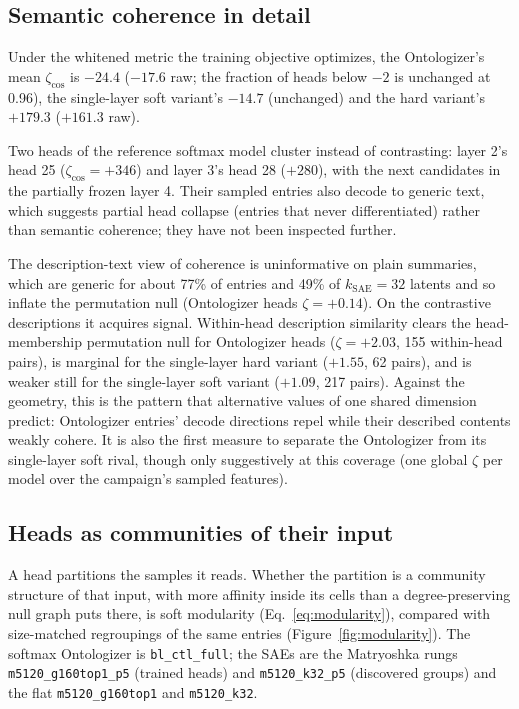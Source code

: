 \subsection{Semantic coherence in detail}
\label{sec:coherence}

Under the whitened metric the training objective optimizes, the
Ontologizer's mean $\zeta_{\cos}$ is $-24.4$ ($-17.6$ raw; the fraction of
heads below $-2$ is unchanged at 0.96), the single-layer soft variant's
$-14.7$ (unchanged) and the hard variant's $+179.3$ ($+161.3$ raw).

Two heads of the reference softmax model cluster instead of contrasting:
layer 2's head 25 ($\zeta_{\cos}{=}{+}346$) and layer 3's head 28
(${+}280$), with the next candidates in the partially frozen layer 4.
Their sampled entries also decode to generic text, which suggests partial
head collapse (entries that never differentiated) rather than semantic
coherence; they have not been inspected further.

The description-text view of coherence is uninformative on plain
summaries, which are generic for about 77\% of entries and 49\% of
$k_{\mathrm{SAE}}{=}32$ latents and so inflate the permutation null
(Ontologizer heads $\zeta{=}{+}0.14$). On the contrastive descriptions it
acquires signal. Within-head description similarity clears the
head-membership permutation null for Ontologizer heads
($\zeta{=}{+}2.03$, 155 within-head pairs), is marginal for the
single-layer hard variant (${+}1.55$, 62 pairs), and is weaker still for
the single-layer soft variant (${+}1.09$, 217 pairs). Against the geometry, this is the pattern
that alternative values of one shared dimension predict: Ontologizer
entries' decode directions repel while their described contents weakly
cohere. It is also the first measure to separate the Ontologizer from its
single-layer soft rival, though only suggestively at this coverage (one
global $\zeta$ per model over the campaign's sampled features).

\subsection{Heads as communities of their input}
\label{sec:modularity}

A head partitions the samples it reads. Whether the partition is a
community structure of that input, with more affinity inside its cells
than a degree-preserving null graph puts there, is soft modularity
(Eq.~\eqref{eq:modularity}), compared with size-matched regroupings of the
same entries (Figure~\ref{fig:modularity}). The softmax Ontologizer is
\texttt{bl\_ctl\_full}; the SAEs are the Matryoshka rungs
\texttt{m5120\_g160top1\_p5} (trained heads) and \texttt{m5120\_k32\_p5}
(discovered groups) and the flat \texttt{m5120\_g160top1} and
\texttt{m5120\_k32}.

